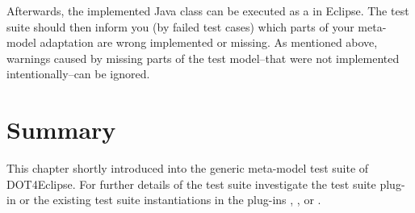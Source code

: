 Afterwards, the implemented Java class can be executed as a  in Eclipse. The test suite should then inform you (by failed test cases) which parts of your meta-model adaptation are wrong implemented or missing. As mentioned above, warnings caused by missing parts of the test model--that were not implemented intentionally--can be ignored.


\section{Summary}

This chapter shortly introduced into the generic meta-model test suite of \acl{DOT4Eclipse}. For further details of the test suite investigate the test suite plug-in  or the existing test suite instantiations in the plug-ins , , or .
